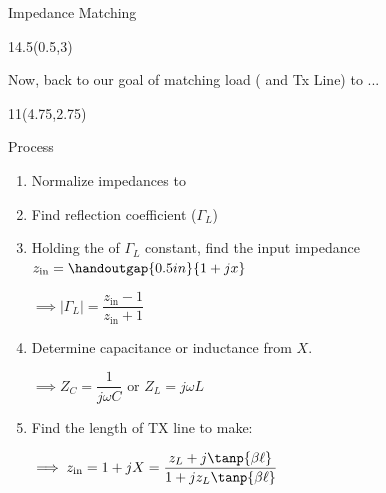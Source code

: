 \begin{frame}{Impedance Matching}

	\begin{textblock}{14.5}(0.5,3)

	Now, back to our goal of matching load ( and Tx Line) to ...
		
		\vspace{1in}
	\end{textblock}
	
	\begin{textblock}{11}(4.75,2.75)
	\begin{myblock}[0.95]{Process}
	
	\begin{small}
	\begin{enumerate}[<+->]
	
		\item Normalize impedances to 
		
		\item Find reflection coefficient ($\Gamma_L$)
		
		\item Holding the  of $\Gamma_L$ constant, find the input impedance $z_{\text{in}} = \handoutgap{0.5in}{1 + jx}$ 
		
		$\implies |\Gamma_L | = \dfrac{z_{\text{in}} - 1}{z_{\text{in}} + 1}$
		
		\item Determine capacitance or inductance from $X$. 
		
		$\implies Z_C = \dfrac{1}{j\omega C} \text{ or } Z_L = j\omega L$
		
		\item Find the length of TX line to make:
		
		$\implies z_{\text{in}} = 1+jX =  \dfrac{z_L + j\tanp{\beta \ell}}{1+jz_L\tanp{\beta\ell}}$
		

	\end{enumerate}
	\end{small}
	
	\end{myblock}
	\end{textblock}

	
	
\end{frame}

